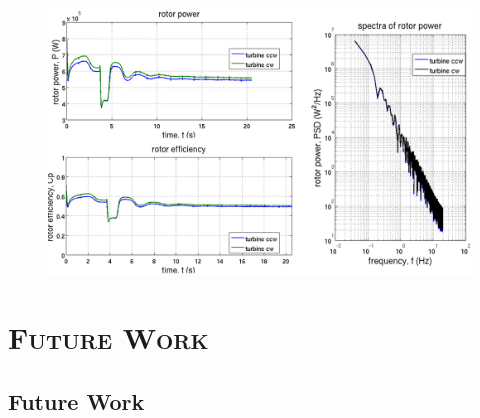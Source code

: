 \documentclass[xcolor=x11names,compress]{beamer}
\begin{document}
	\begin{frame}{}
		
		\vspace{-20pt}

		\begin{figure}[p]
		    \centering
		    \includegraphics[width=1.08\textwidth]{figures/fastFlume__dual-rotor-mesh=TunedMedium-Analysis.png}
		\end{figure}

	\end{frame}


\section{\scshape Future Work}

\subsection{Future Work}
\end{document}
